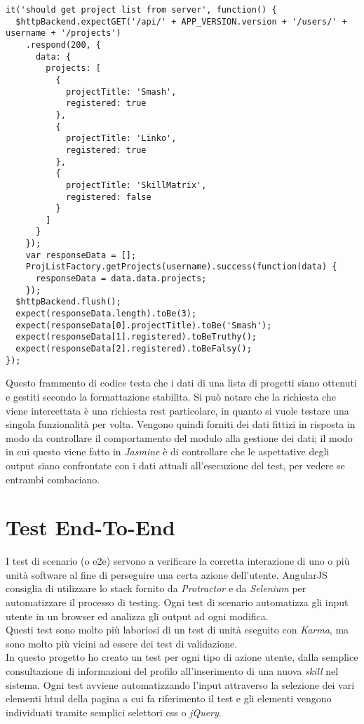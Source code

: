 \begin{verbatim}
it('should get project list from server', function() {
  $httpBackend.expectGET('/api/' + APP_VERSION.version + '/users/' + username + '/projects')
    .respond(200, {
      data: {
        projects: [
          {
            projectTitle: 'Smash',
            registered: true
          },
          {
            projectTitle: 'Linko',
            registered: true
          },
          {
            projectTitle: 'SkillMatrix',
            registered: false
          }
        ]
      }
    });
    var responseData = [];
    ProjListFactory.getProjects(username).success(function(data) {
      responseData = data.data.projects;
    });
  $httpBackend.flush();
  expect(responseData.length).toBe(3);
  expect(responseData[0].projectTitle).toBe('Smash');
  expect(responseData[1].registered).toBeTruthy();
  expect(responseData[2].registered).toBeFalsy();
});
\end{verbatim}
Questo frammento di codice testa che i dati di una lista di progetti siano ottenuti e gestiti secondo la formattazione stabilita. Si può notare che la richiesta che viene intercettata è una richiesta \gls{rest} particolare, in quanto si vuole testare una singola funzionalità per volta. Vengono quindi forniti dei dati fittizi in risposta in modo da controllare il comportamento del modulo alla gestione dei dati; il modo in cui questo viene fatto in \emph{Jasmine} è di controllare che le aspettative degli output siano confrontate con i dati attuali all'esecuzione del test, per vedere se entrambi combaciano.


\newpage

\section{Test End-To-End}
I test di scenario (o \gls{e2e}) servono a verificare la corretta interazione di uno o più unità software al fine di perseguire una certa azione dell'utente. AngularJS consiglia di utilizzare lo stack fornito da \emph{Protractor} e da \emph{Selenium} per automatizzare il processo di testing. Ogni test di scenario automatizza gli input utente in un browser ed analizza gli output ad ogni modifica.\\
Questi test sono molto più laboriosi di un test di unità eseguito con \emph{Karma}, ma sono molto più vicini ad essere dei test di validazione.\\
In questo progetto ho creato un test per ogni tipo di azione utente, dalla semplice consultazione di informazioni del profilo all'inserimento di una nuova \emph{skill} nel sistema. Ogni test avviene automatizzando l'input attraverso la selezione dei vari elementi \gls{html} della pagina a cui fa riferimento il test e gli elementi vengono individuati tramite semplici selettori \gls{css} o \emph{jQuery}.\\

